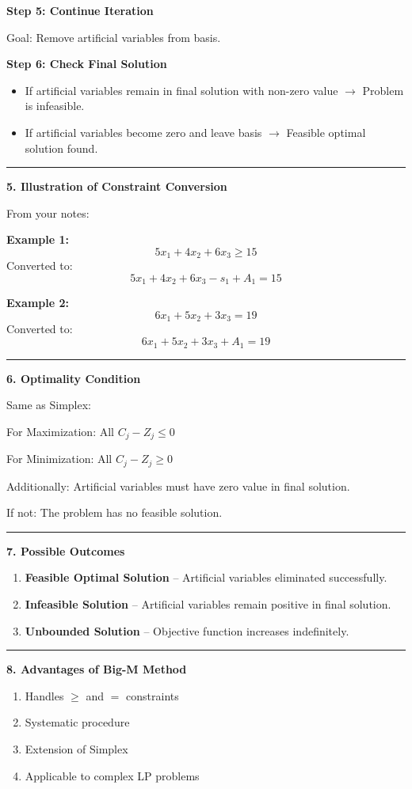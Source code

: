 \documentclass[10pt,a4paper]{article}
\newcommand{\separator}{\vspace{0.4em}\noindent\rule{\linewidth}{0.6pt}\vspace{0.4em}}
\begin{document}
\textbf{Step 5: Continue Iteration}

Goal: Remove artificial variables from basis.

\textbf{Step 6: Check Final Solution}
\begin{itemize}
  \item If artificial variables remain in final solution with non-zero value $\rightarrow$ Problem is infeasible.
  \item If artificial variables become zero and leave basis $\rightarrow$ Feasible optimal solution found.
\end{itemize}

\separator

\textbf{5. Illustration of Constraint Conversion}

From your notes:

\textbf{Example 1:}
\[
5x_1 + 4x_2 + 6x_3 \geq 15
\]
Converted to:
\[
5x_1 + 4x_2 + 6x_3 - s_1 + A_1 = 15
\]

\textbf{Example 2:}
\[
6x_1 + 5x_2 + 3x_3 = 19
\]
Converted to:
\[
6x_1 + 5x_2 + 3x_3 + A_1 = 19
\]

\separator

\textbf{6. Optimality Condition}

Same as Simplex:

For Maximization: All $C_j - Z_j \leq 0$

For Minimization: All $C_j - Z_j \geq 0$

Additionally: Artificial variables must have zero value in final solution.

If not: The problem has no feasible solution.

\separator

\textbf{7. Possible Outcomes}

\begin{enumerate}
  \item \textbf{Feasible Optimal Solution} -- Artificial variables eliminated successfully.
  \item \textbf{Infeasible Solution} -- Artificial variables remain positive in final solution.
  \item \textbf{Unbounded Solution} -- Objective function increases indefinitely.
\end{enumerate}

\separator

\textbf{8. Advantages of Big-M Method}

\begin{enumerate}
  \item Handles $\geq$ and $=$ constraints
  \item Systematic procedure
  \item Extension of Simplex
  \item Applicable to complex LP problems
\end{enumerate}
\end{document}
